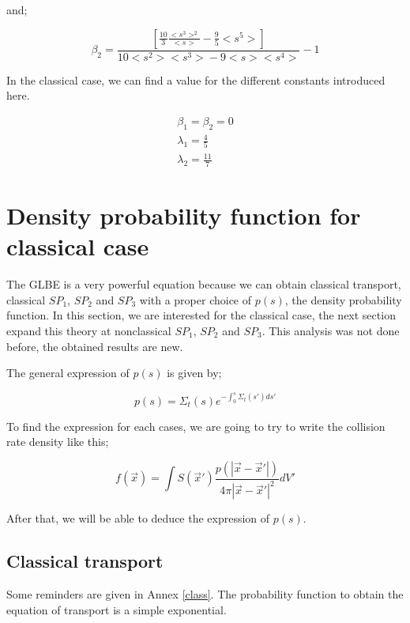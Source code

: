 \documentclass[a4paper, 12pt]{report}
\newcommand{\bl}{\big<}
\newcommand{\bg}{\big>}
\begin{document}
and;

\begin{equation}
\beta_2 = \frac{\left[  \frac{10}{3}\frac{\bl s^3\bg^2}{\bl s\bg}-\frac{9}{5}\bl s^5\bg \right]}{10\bl s^2\bg\bl s^3\bg-9\bl s\bg\bl s^4\bg}-1
\end{equation}

In the classical case, we can find a value for the different constants introduced here.

\begin{align}
\beta_1 = \beta_2 = 0\\
\lambda_1 = \frac{4}{5}\\
\lambda_2 = \frac{11}{7}
\end{align}

\section{Density probability function for classical case}

The GLBE is a very powerful equation because we can obtain classical transport, classical $SP_1$, $SP_2$ and $SP_3$ with a proper choice of $p(s)$, the density probability function. In this section, we are interested for the classical case, the next section expand this theory at nonclassical $SP_1$, $SP_2$ and $SP_3$. This analysis was not done before, the obtained results are new.

The general expression of $p(s)$ is given by;

\begin{equation}
p(s) = \Sigma_t(s) e^{-\int_0^s \Sigma_t(s')ds'} 
\end{equation}

To find the expression for each cases, we are going to try to write the collision rate density like this;

\begin{equation}\label{123}
f(\vec{x}) = \int S(\vec{x}') \frac{p(|\vec{x}-\vec{x}'|)}{4\pi|\vec{x}-\vec{x}'|^2}dV'
\end{equation}

After that, we will be able to deduce the expression of $p(s)$.

\subsection{Classical transport}

Some reminders are given in Annex \ref{class}. The probability function to obtain the equation of transport is a simple exponential.
\end{document}
